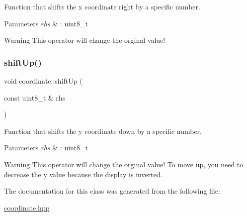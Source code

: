 Function that shifts the x coordinate right by a specific number. 


\begin{DoxyParams}{Parameters}
{\em rhs} & \+: uint8\+\_\+t \\
\hline
\end{DoxyParams}
\begin{DoxyWarning}{Warning}
This operator will change the orginal value! 
\end{DoxyWarning}
\mbox{\label{classcoordinate_a895e556f2a260c583ae167789bf97d03}} 
\subsubsection{\texorpdfstring{shift\+Up()}{shiftUp()}}
{\footnotesize\ttfamily void coordinate\+::shift\+Up (\begin{DoxyParamCaption}\item[{const uint8\+\_\+t \&}]{rhs }\end{DoxyParamCaption})\hspace{0.3cm}{\ttfamily [inline]}}



Function that shifts the y coordinate down by a specific number. 


\begin{DoxyParams}{Parameters}
{\em rhs} & \+: uint8\+\_\+t \\
\hline
\end{DoxyParams}
\begin{DoxyWarning}{Warning}
This operator will change the orginal value! To move up, you need to decrease the y value because the display is inverted. 
\end{DoxyWarning}


The documentation for this class was generated from the following file\+:\begin{DoxyCompactItemize}
\item 
\hyperlink{coordinate_8hpp}{coordinate.\+hpp}\end{DoxyCompactItemize}
